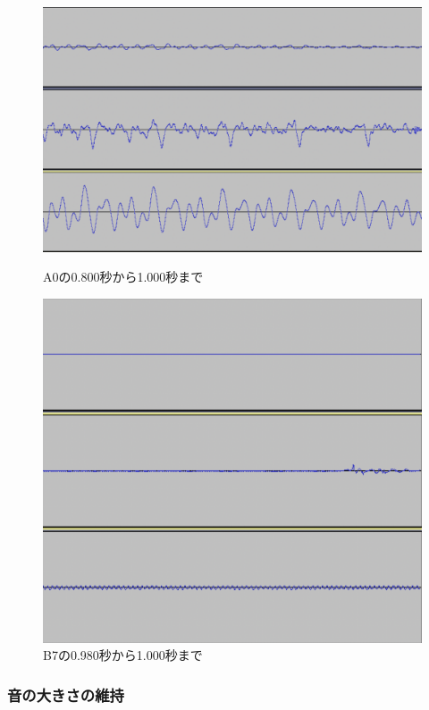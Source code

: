 \begin{figure}[b]
\centering
\begin{minipage}{0.48\columnwidth}
\centering
\includegraphics[width=0.85\columnwidth]{figure/88_88_det/a0_0800_1000.png}
\caption[A0の音波]{A0の0.800秒から1.000秒まで}
\label{fig:88_88_reduce1}
\end{minipage}
\begin{minipage}{0.48\columnwidth}
\centering
\includegraphics[width=0.75\columnwidth]{figure/88_88_det/b7_0980_1000.png}
\caption[B7の音波]{B7の0.980秒から1.000秒まで}
\label{fig:88_88_reduce2}
\end{minipage}
\end{figure}

\clearpage

\subsubsection{音の大きさの維持}

